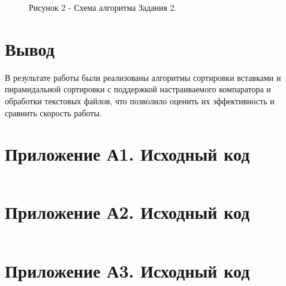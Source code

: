 \documentclass[oneside,a4paper,14pt]{extarticle}
\begin{document}
\begin{figure}[H]
	\centering
	\caption*{Рисунок 2 - Схема алгоритма Задания 2.}
\end{figure}

\section*{Вывод}


В результате работы были реализованы алгоритмы сортировки вставками и пирамидальной сортировки с поддержкой настраиваемого компаратора и обработки текстовых файлов, что позволило оценить их эффективность и сравнить скорость работы.
\newpage

\section*{Приложение А1. Исходный код}
\inputminted{cpp}{code/cdll.h}

\section*{Приложение А2. Исходный код}
\inputminted{cpp}{code/cdll.c}

\section*{Приложение А3. Исходный код}
\inputminted{cpp}{code/cli.c}
\end{document}

